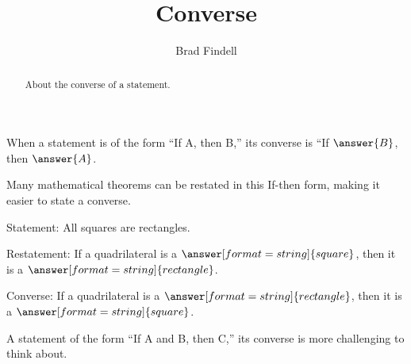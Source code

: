 \documentclass[nooutcomes]{ximera}
\title{Converse}
\author{Brad Findell}
\begin{document}
\begin{abstract}
About the converse of a statement. 
\end{abstract}
\maketitle

%
%

\begin{problem}
When a statement is of the form ``If A, then B,'' its converse is ``If $\answer{B}$, then $\answer{A}$.  

\end{problem}

\begin{problem}
Many mathematical theorems can be restated in this If-then form, making it easier to state a converse. 

Statement: All squares are rectangles.  

Restatement: If a quadrilateral is a $\answer[format=string]{square}$, then it is a $\answer[format=string]{rectangle}$.  

Converse: If a quadrilateral is a $\answer[format=string]{rectangle}$, then it is a $\answer[format=string]{square}$.  


A statement of the form ``If A and B, then C,'' its converse is more challenging to think about.  
\end{problem}
\end{document}

